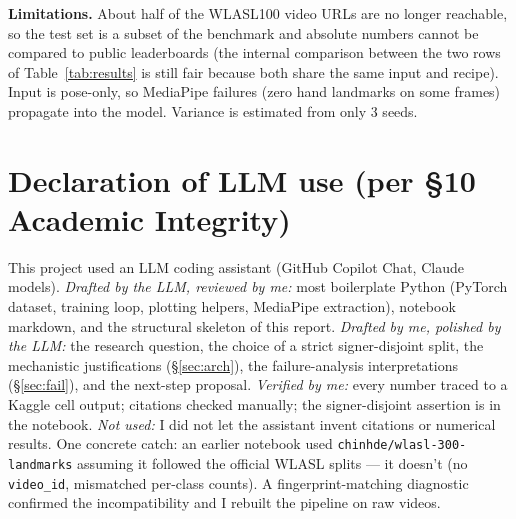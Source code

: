 \documentclass[11pt,a4paper]{article}
\begin{document}
\textbf{Limitations.} About half of the WLASL100 video URLs are no longer reachable, so the test set is a subset of the benchmark and absolute numbers cannot be compared to public leaderboards (the internal comparison between the two rows of Table~\ref{tab:results} is still fair because both share the same input and recipe). Input is pose-only, so MediaPipe failures (zero hand landmarks on some frames) propagate into the model. Variance is estimated from only 3 seeds.

\section*{Declaration of LLM use (per \S10 Academic Integrity)}

This project used an LLM coding assistant (GitHub Copilot Chat, Claude models). \emph{Drafted by the LLM, reviewed by me:} most boilerplate Python (PyTorch dataset, training loop, plotting helpers, MediaPipe extraction), notebook markdown, and the structural skeleton of this report. \emph{Drafted by me, polished by the LLM:} the research question, the choice of a strict signer-disjoint split, the mechanistic justifications (\S\ref{sec:arch}), the failure-analysis interpretations (\S\ref{sec:fail}), and the next-step proposal. \emph{Verified by me:} every number traced to a Kaggle cell output; citations checked manually; the signer-disjoint assertion is in the notebook. \emph{Not used:} I did not let the assistant invent citations or numerical results. One concrete catch: an earlier notebook used \texttt{chinhde/wlasl-300-landmarks} assuming it followed the official WLASL splits — it doesn't (no \texttt{video\_id}, mismatched per-class counts). A fingerprint-matching diagnostic confirmed the incompatibility and I rebuilt the pipeline on raw videos.
\end{document}
